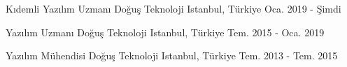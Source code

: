 

\begin{cventries}

  \cventry
    {Kıdemli Yazılım Uzmanı} %
    {Doğuş Teknoloji} %
    {Istanbul, Türkiye} %
    {Oca. 2019 - Şimdi} %
    {}

  \cventry
    {Yazılım Uzmanı} %
    {Doğuş Teknoloji} %
    {Istanbul, Türkiye} %
    {Tem. 2015 - Oca. 2019} %
    {}

  \cventry
    {Yazılım Mühendisi} %
    {Doğuş Teknoloji} %
    {Istanbul, Türkiye} %
    {Tem. 2013 - Tem. 2015} %
    {}

\end{cventries}
